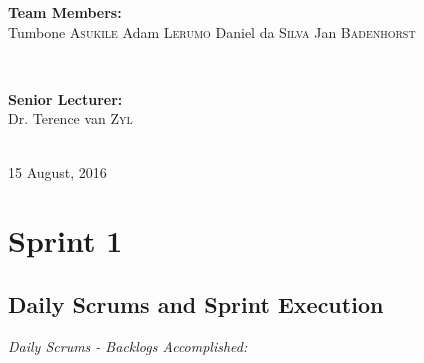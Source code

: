 \documentclass[a4paper]{article}
\begin{document}
\begin{titlepage}
\begin{minipage}{0.4\textwidth}
\begin{flushleft}
\textbf{Team Members:} \\[0.3cm]

Tumbone \textsc{Asukile} \newline
Adam \textsc{Lerumo} \newline
Daniel da \textsc{Silva} \newline
Jan \textsc{Badenhorst} \newline

\end{flushleft}

\end{minipage} \\[0.7cm]

\begin{minipage}{0.4\textwidth}

\begin{flushright} \large

\textbf{Senior Lecturer:} \\[0.3cm]

Dr. Terence van \textsc{Zyl}

\end{flushright}

\end{minipage} \\[1cm]

{\large 15 August, 2016} 
    
\end{titlepage}

\setlength\parindent{24pt}

\newpage

\section{Sprint 1}

\subsection{Daily Scrums and Sprint Execution}

\emph{Daily Scrums - Backlogs Accomplished:}
\end{document}
